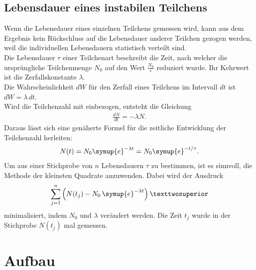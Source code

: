     \subsection{Lebensdauer eines instabilen Teilchens}

    Wenn die Lebensdauer eines einzelnen Teilchens gemessen wird,
    kann aus dem Ergebnis kein Rückschluss auf die Lebensdauer
    anderer Teilchen gezogen werden, weil die individuellen Lebensdauern
    statistisch verteilt sind. \\
    Die Lebensdauer $\tau$ einer Teilchenart beschreibt die Zeit, nach welcher
    die ursprüngliche Teilchenmenge $N_0$ auf den Wert $\frac{N_0}e$ reduziert
    wurde. Ihr Kehrwert ist die Zerfallskonstante $\lambda.$\\
    Die Wahrscheinlichkeit $dW$ für den Zerfall eines Teilchens im Intervall $dt$ ist
    $dW=\lambda\,dt.$\\
    Wird die Teilchenzahl mit einbezogen, entsteht die Gleichung
    \begin{align*}
      \frac{dN}{dt}=-\lambda N.
    \end{align*}
    Daraus lässt sich eine genäherte Formel für die zeitliche Entwicklung der
    Teilchenzahl herleiten:
    \begin{align*}
      N(t)=N_0\symup{e}^{-\lambda t}=N_0\symup{e}^{-t/\tau}.
    \end{align*}
    Um aus einer Stichprobe von $n$ Lebensdauern $\tau$ zu bestimmen,
    ist es sinnvoll, die Methode der kleinsten Quadrate anzuwenden.
    Dabei wird der Ausdruck
    \begin{align*}
      \sum_{j=1}^n \left(N(t_j)-N_0\,\symup{e}^{-\lambda t}\right)²
    \end{align*}
    minimalisiert, indem $N_0$ und $\lambda$ verändert werden.
    Die Zeit $t_j$ wurde in der Stichprobe $N(t_j)$ mal gemessen.



  \section{Aufbau}

